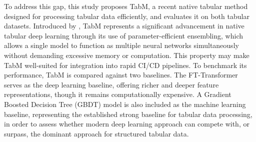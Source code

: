 To address this gap, this study proposes TabM, a recent native tabular method designed for processing tabular data efficiently, and evaluates it on both tabular datasets. Introduced by \citet{gorishniy_tabm_2025}, TabM represents a significant advancement in native tabular deep learning through its use of parameter-efficient ensembling, which allows a single model to function as multiple neural networks simultaneously without demanding excessive memory or computation. This property may make TabM well-suited for integration into rapid CI/CD pipelines. To benchmark its performance, TabM is compared against two baselines. The FT-Transformer serves as the deep learning baseline, offering richer and deeper feature representations, though it remains computationally expensive. A Gradient Boosted Decision Tree (GBDT) model is also included as the machine learning baseline, representing the established strong baseline for tabular data processing, in order to assess whether modern deep learning approach can compete with, or surpass, the dominant approach for structured tabular data.
